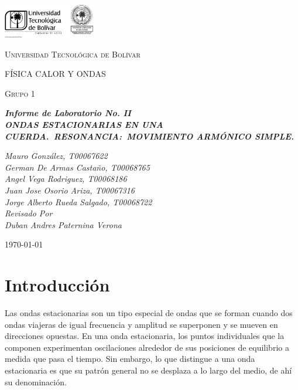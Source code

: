 \documentclass[twocolumn, 12pt]{article}
\begin{document}
\begin{titlepage}
    \centering
    \includegraphics[width=0.3\textwidth]{Images/logo_utb.png}\par\vspace{1cm}
    {\scshape\LARGE Universidad Tecnológica de Bolívar \par}
    \vspace{1cm}

    {\scshape\Large FÍSICA CALOR Y ONDAS \par}
    \vspace{.2cm}

    {\scshape\Large Grupo 1 \par}
    \vspace{1cm}
    \slshape {\Large \bfseries{}Informe de Laboratorio No. II\\}
    \slshape {\small \bfseries{} ONDAS ESTACIONARIAS EN UNA CUERDA.~RESONANCIA:\@{}~MOVIMIENTO ARMÓNICO SIMPLE.}
    \vspace{2cm}

    \slshape {\itshape{} Mauro González, T00067622 \\}
    \slshape {\itshape{} German De Armas Castaño, T00068765 \\}
    \slshape {\itshape{} Angel Vega Rodriguez, T00068186 \\}
    \slshape {\itshape{} Juan Jose Osorio Ariza, T00067316 \\}
    \slshape {\itshape{} Jorge Alberto Rueda Salgado, T00068722 \\}
    \vfill
    Revisado Por \\
    Duban Andres Paternina Verona\\
    {\large \today\par}
\end{titlepage}


\section{Introducción}

Las ondas estacionarias son un tipo especial de ondas que se forman cuando dos ondas 
viajeras de igual frecuencia y amplitud se superponen y se mueven en direcciones opuestas. 
En una onda estacionaria, los puntos individuales que la componen experimentan oscilaciones 
alrededor de sus posiciones de equilibrio a medida que pasa el tiempo. Sin embargo, lo que 
distingue a una onda estacionaria es que su patrón general no se desplaza a lo largo del medio, 
de ahí su denominación.
\end{document}
